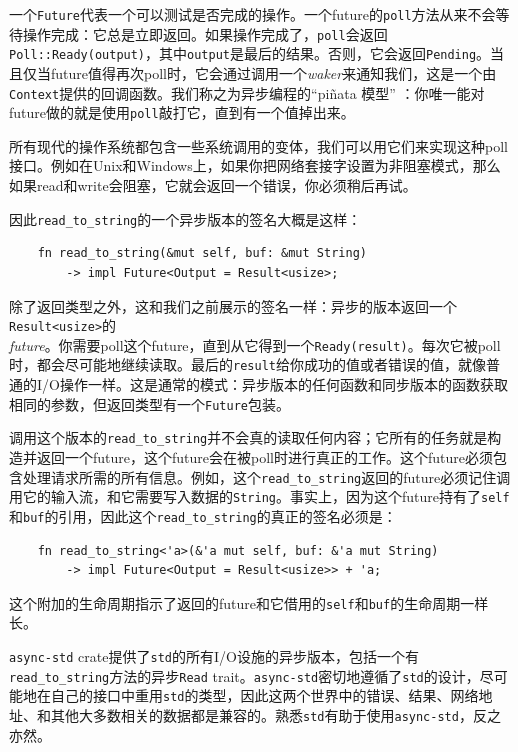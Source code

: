 一个\texttt{Future}代表一个可以测试是否完成的操作。一个future的\texttt{poll}方法从来不会等待操作完成：它总是立即返回。如果操作完成了，\texttt{poll}会返回\texttt{Poll::Ready(output)}，其中\texttt{output}是最后的结果。否则，它会返回\texttt{Pending}。当且仅当future值得再次poll时，它会通过调用一个\emph{waker}来通知我们，这是一个由\texttt{Context}提供的回调函数。我们称之为异步编程的“piñata 模型” ：你唯一能对future做的就是使用\texttt{poll}敲打它，直到有一个值掉出来。

所有现代的操作系统都包含一些系统调用的变体，我们可以用它们来实现这种poll接口。例如在Unix和Windows上，如果你把网络套接字设置为非阻塞模式，那么如果read和write会阻塞，它就会返回一个错误，你必须稍后再试。

因此\texttt{read\_to\_string}的一个异步版本的签名大概是这样：
\begin{verbatim}
    fn read_to_string(&mut self, buf: &mut String)
        -> impl Future<Output = Result<usize>;
\end{verbatim}

除了返回类型之外，这和我们之前展示的签名一样：异步的版本返回一个\texttt{Result<usize>}的\\
\emph{future}。你需要poll这个future，直到从它得到一个\texttt{Ready(result)}。每次它被poll时，都会尽可能地继续读取。最后的\texttt{result}给你成功的值或者错误的值，就像普通的I/O操作一样。这是通常的模式：异步版本的任何函数和同步版本的函数获取相同的参数，但返回类型有一个\texttt{Future}包装。

调用这个版本的\texttt{read\_to\_string}并不会真的读取任何内容；它所有的任务就是构造并返回一个future，这个future会在被poll时进行真正的工作。这个future必须包含处理请求所需的所有信息。例如，这个\texttt{read\_to\_string}返回的future必须记住调用它的输入流，和它需要写入数据的\texttt{String}。事实上，因为这个future持有了\texttt{self}和\texttt{buf}的引用，因此这个\texttt{read\_to\_string}的真正的签名必须是：
\begin{verbatim}
    fn read_to_string<'a>(&'a mut self, buf: &'a mut String)
        -> impl Future<Output = Result<usize>> + 'a;
\end{verbatim}

这个附加的生命周期指示了返回的future和它借用的\texttt{self}和\texttt{buf}的生命周期一样长。

\texttt{async-std} crate提供了\texttt{std}的所有I/O设施的异步版本，包括一个有\texttt{read\_to\_string}方法的异步\texttt{Read} trait。\texttt{async-std}密切地遵循了\texttt{std}的设计，尽可能地在自己的接口中重用\texttt{std}的类型，因此这两个世界中的错误、结果、网络地址、和其他大多数相关的数据都是兼容的。熟悉\texttt{std}有助于使用\texttt{async-std}，反之亦然。

